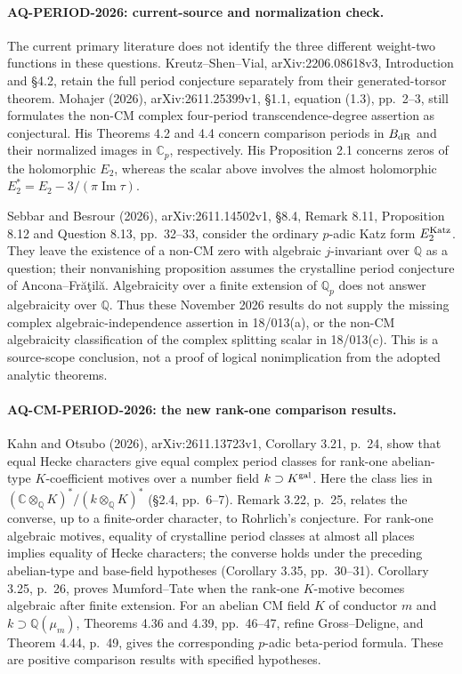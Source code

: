 \paragraph{AQ-PERIOD-2026: current-source and normalization check.}
The current primary literature does not identify the
three different weight-two functions in these questions.
Kreutz--Shen--Vial, arXiv:2206.08618v3, Introduction
and \S4.2, retain the full period conjecture separately
from their generated-torsor theorem. Mohajer (2026),
arXiv:2611.25399v1, \S1.1, equation (1.3), pp.~2--3,
still formulates the non-CM complex four-period
transcendence-degree assertion as conjectural.
His Theorems 4.2 and 4.4 concern comparison periods
in $B_{\rm dR}$ and their normalized images in
$\mathbb C_p$, respectively. His Proposition 2.1
concerns zeros of the holomorphic $E_2$, whereas
the scalar above involves the almost holomorphic
$E_2^*=E_2-3/(\pi\operatorname{Im}\tau)$.

Sebbar and Besrour (2026), arXiv:2611.14502v1,
\S8.4, Remark 8.11, Proposition 8.12 and
Question 8.13, pp.~32--33, consider the ordinary
$p$-adic Katz form $E^{\rm Katz}_2$. They leave
the existence of a non-CM zero with algebraic
$j$-invariant over $\mathbb Q$ as a question;
their nonvanishing proposition assumes the crystalline
period conjecture of Ancona--Fr\u a\c til\u a.
Algebraicity over a finite extension of $\mathbb Q_p$
does not answer algebraicity over $\mathbb Q$.
Thus these November 2026 results do not supply the
missing complex algebraic-independence assertion in
18/013(a), or the non-CM algebraicity classification of
the complex splitting scalar in 18/013(c). This is a
source-scope conclusion, not a proof of logical
nonimplication from the adopted analytic theorems.

\paragraph{AQ-CM-PERIOD-2026: the new rank-one comparison results.}
Kahn and Otsubo (2026), arXiv:2611.13723v1,
Corollary 3.21, p.~24, show that equal Hecke characters
give equal complex period classes for rank-one abelian-type
$K$-coefficient motives over a number field $k\supset K^{\rm gal}$.
Here the class lies in
$(\mathbb C\otimes_{\mathbb Q}K)^*/(k\otimes_{\mathbb Q}K)^*$
(\S2.4, pp.~6--7).
Remark 3.22, p.~25, relates the converse, up to a finite-order
character, to Rohrlich's conjecture.
For rank-one algebraic motives, equality of crystalline period
classes at almost all places implies equality of Hecke characters;
the converse holds under the preceding abelian-type and base-field
hypotheses (Corollary 3.35, pp.~30--31).
Corollary 3.25, p.~26, proves Mumford--Tate when the rank-one
$K$-motive becomes algebraic after finite extension.
For an abelian CM field $K$ of conductor $m$ and
$k\supset\mathbb Q(\mu_m)$,
Theorems 4.36 and 4.39, pp.~46--47,
refine Gross--Deligne, and Theorem 4.44, p.~49,
gives the corresponding $p$-adic beta-period formula.
These are positive comparison results with specified hypotheses.

